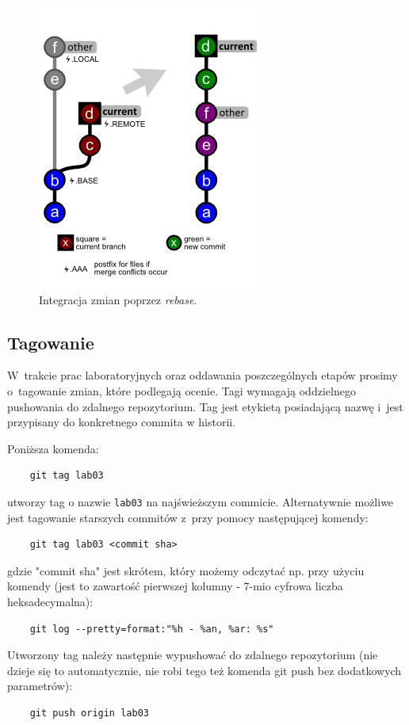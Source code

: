 \documentclass[12pt]{article}
\begin{document}
        \begin{figure}[ht]
            \centering
            \includegraphics{git-rebase}
            \caption{Integracja zmian poprzez \textit{rebase}.}
            \label{fig:git-rebase}
        \end{figure}

        \subsection*{Tagowanie}
        W~trakcie prac laboratoryjnych oraz oddawania poszczególnych etapów prosimy o~tagowanie zmian, które podlegają ocenie. Tagi wymagają oddzielnego pushowania do zdalnego repozytorium. Tag jest etykietą posiadającą nazwę i~jest przypisany do konkretnego commita w historii.

        Poniższa komenda:
        \begin{verbatim}
    git tag lab03
        \end{verbatim}
        utworzy tag o nazwie \texttt{lab03} na najświeższym commicie. Alternatywnie możliwe jest tagowanie starszych commitów z~przy pomocy następującej komendy:
        \begin{verbatim}
    git tag lab03 <commit sha>
        \end{verbatim}
        gdzie "commit sha" jest skrótem, który możemy odczytać np. przy użyciu komendy (jest to zawartość pierwszej kolumny - 7-mio cyfrowa liczba heksadecymalna):
        \begin{verbatim}
    git log --pretty=format:"%h - %an, %ar: %s"
        \end{verbatim}
        Utworzony tag należy następnie wypushować do zdalnego repozytorium (nie dzieje się to automatycznie, nie robi tego też komenda git push bez dodatkowych parametrów):
        \begin{verbatim}
    git push origin lab03
        \end{verbatim}
\end{document}
